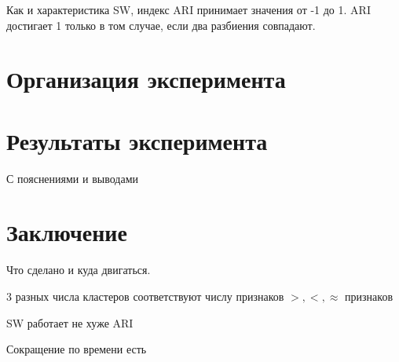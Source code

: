 \documentclass[12pt]{a&t}
\begin{document}
Как и характеристика SW, индекс ARI принимает значения от -1 до 1. ARI достигает 1 только в том случае, если два разбиения совпадают.

\section{Организация эксперимента}

\section{Результаты эксперимента}
С пояснениями и выводами

\section{Заключение}

Что сделано и куда двигаться.
\begin{enumlist} %
	\item
	3 разных числа кластеров соответствуют числу признаков $ >,<,\approx $ признаков	
	\item
	SW работает не хуже ARI
	\item
	Сокращение по времени есть
\end{enumlist}
\end{document}
